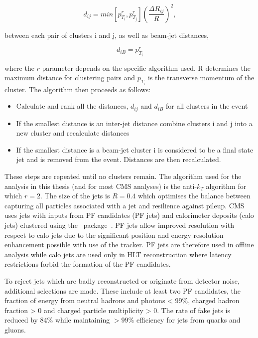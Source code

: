 \begin{equation}
d_{ij} = min\left[p^r_{T_i},p^r_{T_j}\right]\left(\frac{\Delta R_{ij}}{R}\right)^2,
\end{equation}

between each pair of clusters i and j, as well as beam-jet distances, 

\begin{equation}
d_{iB} = p^r_{T_i}
\end{equation}

where the $r$ parameter depends on the specific algorithm used, R determines the maximum distance
for clustering pairs and $p_{T_i}$ is the transverse momentum of the cluster. The algorithm then proceeds
as follows:
\begin{itemize}
\item Calculate and rank all the distances, $d_{ij}$ and $d_{iB}$ for all clusters in the event
\item If the smallest distance is an inter-jet distance combine clusters i and j into a new cluster and recalculate distances
\item If the smallest distance is a beam-jet cluster i is considered to be a final state jet and is removed from the event. Distances 
are then recalculated.
\end{itemize}

These steps are repeated until no clusters remain. The algorithm used for the analysis in this thesis (and for most CMS analyses) is 
the anti-$k_T$ algorithm for which $r=2$. The size of the jets is $R=0.4$ which optimises the balance between capturing all particles
associated with a jet and resilience against pileup. CMS uses jets with inputs from PF candidates (PF jets) and calorimeter deposits (calo jets)
clustered using the \FASTJET~package~\cite{fastjet}. PF jets allow improved resolution with respect to calo jets due to the significant position and energy resolution 
enhancement possible with use of the tracker. PF jets are therefore used in offline analysis while calo jets are used only in HLT reconstruction
where latency restrictions forbid the formation of the PF candidates. 

To reject jets which are badly reconstructed or originate from detector noise, additional selections are made. These include at least
two PF candidates, the fraction of energy from neutral hadrons and photons < 99\%,  charged hadron fraction > 0 and charged particle multiplicity > 0.
The rate of fake jets is reduced by 84\% while maintaining $> 99\%$ efficiency for jets from quarks and gluons.

